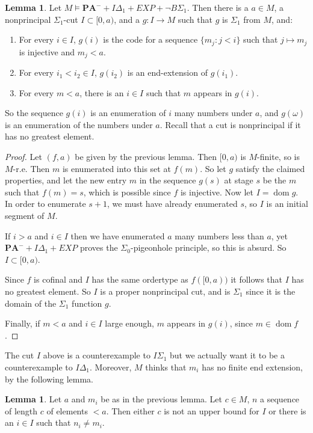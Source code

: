 \documentclass[12pt]{report}
\newcommand{\PA}{\mathbf{PA}}
\DeclareMathOperator{\dom}{dom}
\theoremstyle{definition}
\newtheorem{lemma}[theorem]{Lemma}
\begin{document}
\begin{lemma}
Let $M \models \PA^- + I\Delta_1 + EXP + \neg B\Sigma_1$. Then there is a $a \in M$, a nonprincipal $\Sigma_1$-cut $I \subset [0, a)$, and a $g: I \to M$ such that $g$ is $\Sigma_1$ from $M$, and:
\begin{enumerate}
\item For every $i \in I$, $g(i)$ is the code for a sequence $\{m_j: j < i\}$ such that $j \mapsto m_j$ is injective and $m_j < a$.
\item For every $i_1 < i_2 \in I$, $g(i_2)$ is an end-extension of $g(i_1)$.
\item For every $m < a$, there is an $i \in I$ such that $m$ appears in $g(i)$.
\end{enumerate}
\end{lemma}
So the sequence $g(i)$ is an enumeration of $i$ many numbers under $a$, and $g(\omega)$ is an enumeration of the numbers under $a$. Recall that a cut is nonprincipal if it has no greatest element.
\begin{proof}
Let $(f, a)$ be given by the previous lemma. Then $[0, a)$ is $M$-finite, so is $M$-r.e. Then $m$ is enumerated into this set at $f(m)$. So let $g$ satisfy the claimed properties, and let the new entry $m$ in the sequence $g(s)$ at stage $s$ be the $m$ such that $f(m) = s$, which is possible since $f$ is injective.
Now let $I = \dom g$. In order to enumerate $s + 1$, we must have already enumerated $s$, so $I$ is an initial segment of $M$.

If $i > a$ and $i \in I$ then we have enumerated $a$ many numbers less than $a$, yet $\PA^- + I\Delta_1 + EXP$ proves the $\Sigma_0$-pigeonhole principle, so this is absurd. So $I \subset [0, a)$.

Since $f$ is cofinal and $I$ has the same ordertype as $f([0, a))$ it follows that $I$ has no greatest element. So $I$ is a proper nonprincipal cut, and is $\Sigma_1$ since it is the domain of the $\Sigma_1$ function $g$.

Finally, if $m < a$ and $i \in I$ large enough, $m$ appears in $g(i)$, since $m \in \dom f$.
\end{proof}
The cut $I$ above is a counterexample to $I\Sigma_1$ but we actually want it to be a counterexample to $I\Delta_1$. Moreover, $M$ thinks that $m_i$ has no finite end extension, by the following lemma.
\begin{lemma}
Let $a$ and $m_i$ be as in the previous lemma. Let $c \in M$, $n$ a sequence of length $c$ of elements $< a$. Then either $c$ is not an upper bound for $I$ or there is an $i \in I$ such that $n_i \neq m_i$.
\end{lemma}
\end{document}
